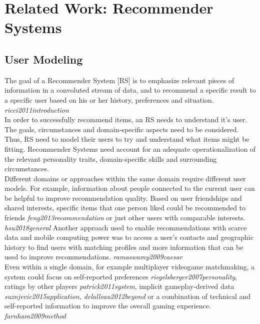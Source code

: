 \documentclass[nochapterpage,bigchapter,linedtoc,longdoc,colorback,accentcolor=tud3b,oneside]{tudreport}
\begin{document}
\renewcommand{\cleardoublepage}{}
\renewcommand{\clearpage}{}


\chapter{Related Work: Recommender Systems}

\section{User Modeling} \label{rw:usermodeling}
The goal of a Recommender System [RS] is to emphasize relevant pieces of information in a convoluted stream of data, and to recommend a specific result to a specific user based on his or her history, preferences and situation. \textit{ricci2011introduction}\\
In order to successfully recommend items, an RS needs to understand it's user. The goals, circumstances and domain-specific aspects need to be considered. Thus, RS need to model their users to try and understand what items might be fitting. Recommender Systems need account for an adequate operationalization of the relevant personality traits, domain-specific skills and surrounding circumstances.\\
Different domains or approaches within the same domain require different user models. For example, information about people connected to the current user can be helpful to improve recommendation quality. Based on user friendships and shared interests, specific items that one person liked could be recommended to friends \textit{feng2013recommendation} or just other users with comparable interests. \textit{hsu2018general} Another approach used to enable recommendations with scarce data and mobile computing power was to access a user's contacts and geographic history to find users with matching profiles and more information that can be used to improve recommendations. \textit{ramaswamy2009caesar}\\ 
Even within a single domain, for example multiplayer videogame matchmaking, a system could focus on self-reported preferences \textit{riegelsberger2007personality}, ratings by other players \textit{patrick2011system}, implicit gameplay-derived data \textit{suznjevic2015application, delalleau2012beyond} or a combination of technical and self-reported information to improve the overall gaming experience. \textit{farnham2009method}\\
\end{document}
